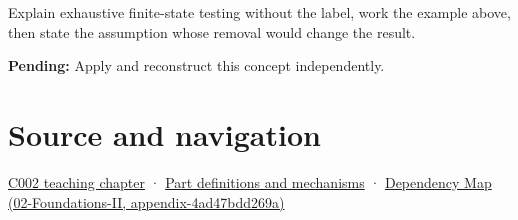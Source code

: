 Explain exhaustive finite-state testing without the label, work the example above, then state the assumption whose removal would change the result.

\textbf{Pending:} Apply and reconstruct this concept independently.

\section{Source and navigation}\label{appendix-05db24ccc28a-source-and-navigation}

\href{Continuous\%20Notes/Computing\%20Foundations\%20-\%20From\%20Bits\%20to\%20C++\%20and\%20Systems\%20APIs\#Arithmetic\%20becomes\%20a\%20policy}{C002 teaching chapter} · \hyperref[appendix-fd090d982a15]{Part definitions and mechanisms} · \href{../02-Foundations-II/main.pdf\#nameddest=appendix-4ad47bdd269a}{Dependency Map (02-Foundations-II, appendix-4ad47bdd269a)}
